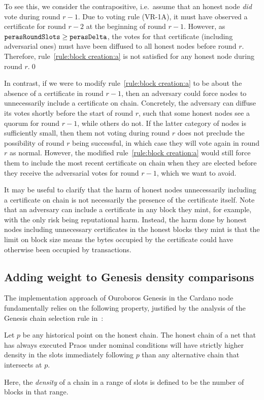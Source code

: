 To see this, we consider the contrapositive, i.e.\ assume that an honest node \emph{did} vote during round $r-1$.
Due to voting rule (VR-1A), it must have observed a certificate for round $r-2$ at the beginning of round $r-1$.
However, as $\mathtt{perasRoundSlots}\ge\mathtt{perasDelta}$, the votes for that certificate (including adversarial ones) must have been diffused to all honest nodes before round $r$.
Therefore, rule~\ref{rule:block creation:a} is not satisfied for any honest node during round $r$.\qed{}

In contrast, if we were to modify rule~\ref{rule:block creation:a} to be about the absence of a certificate in round $r-1$, then an adversary could force nodes to unnecessarily include a certificate on chain.
Concretely, the adversary can diffuse its votes shortly before the start of round $r$, such that some honest nodes see a quorum for round $r-1$, while others do not.
If the latter category of nodes is sufficiently small, then them not voting during round $r$ does not preclude the possibility of round $r$ being successful, in which case they will vote again in round $r$ as normal.
However, the modified rule~\ref{rule:block creation:a} would still force them to include the most recent certificate on chain when they are elected before they receive the adversarial votes for round $r-1$, which we want to avoid.

It may be useful to clarify that the harm of honest nodes unnecessarily including a certificate on chain is not necessarily the presence of the certificate itself.
Note that an adversary can include a certificate in any block they mint, for example, with the only risk being reputational harm.
Instead, the harm done by honest nodes including unnecessary certificates in the honest blocks they mint is that the limit on block size means the bytes occupied by the certificate could have otherwise been occupied by transactions.

\subsection{Adding weight to Genesis density comparisons}\label{sec:weighted genesis}

The implementation approach of Ouroboros Genesis in the Cardano node fundamentally relies on the following property, justified by the analysis of the Genesis chain selection rule in~\cite{badertscher2018ouroboros}:
\begin{tcolorbox}[title=\densityOfCompetingChainsName]\label{property:density-of-competing-chains}
  Let $p$ be any historical point on the honest chain. The honest chain of a net that has always executed Praos under nominal conditions will have strictly higher density in the \sgen{} slots immediately following $p$ than any alternative chain that intersects at $p$.
\end{tcolorbox}
Here, the \emph{density} of a chain in a range of slots is defined to be the number of blocks in that range.

